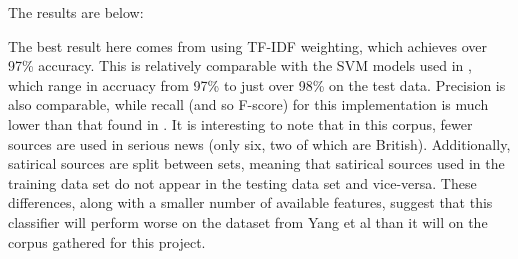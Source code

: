 \documentclass [12 pt] {report}
\begin{document}
The results are below:
\vspace*{-2mm}
\begin{table}[H]
\small
{}
\label{table:Yang}
\end{table}
\FloatBarrier
\vspace*{-2mm}
\begin{table}[H]
\small
{}
\label{table:Yang Confusion}
\end{table}

The best result here comes from using TF-IDF weighting, which achieves over 97\% accuracy. This is relatively comparable with the SVM models used in \cite{Yang}, which range in accruacy from 97\% to just over 98\% on the test data. Precision is also comparable, while recall (and so F-score) for this implementation is much lower than that found in \cite{Yang}. It is interesting to note that in this corpus, fewer sources are used in serious news (only six, two of which are British). Additionally, satirical sources are split between sets, meaning that satirical sources used in the training data set do not appear in the testing data set and vice-versa. These differences, along with a smaller number of available features, suggest that this classifier will perform worse on the dataset from Yang et al than it will on the corpus gathered for this project.
\end{document}
